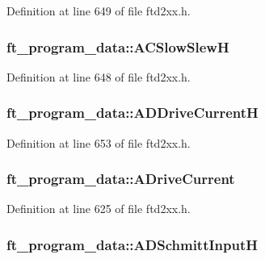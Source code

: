 Definition at line 649 of file ftd2xx.h.\hypertarget{structft__program__data_a660e3fbc4b880617a4301f6149d8f658}{
\subsubsection[{ACSlowSlewH}]{ {\bf ft\_\-program\_\-data::ACSlowSlewH}}}
\label{structft__program__data_a660e3fbc4b880617a4301f6149d8f658}


Definition at line 648 of file ftd2xx.h.\hypertarget{structft__program__data_acbb0755968deda2992031f7d1b99e1a7}{
\subsubsection[{ADDriveCurrentH}]{ {\bf ft\_\-program\_\-data::ADDriveCurrentH}}}
\label{structft__program__data_acbb0755968deda2992031f7d1b99e1a7}


Definition at line 653 of file ftd2xx.h.\hypertarget{structft__program__data_a0c568765a812cf9f2e0681ffb6618943}{
\subsubsection[{ADriveCurrent}]{ {\bf ft\_\-program\_\-data::ADriveCurrent}}}
\label{structft__program__data_a0c568765a812cf9f2e0681ffb6618943}


Definition at line 625 of file ftd2xx.h.\hypertarget{structft__program__data_a6e03913656e3e15d33ec5b1620e5df15}{
\subsubsection[{ADSchmittInputH}]{ {\bf ft\_\-program\_\-data::ADSchmittInputH}}}
\label{structft__program__data_a6e03913656e3e15d33ec5b1620e5df15}


